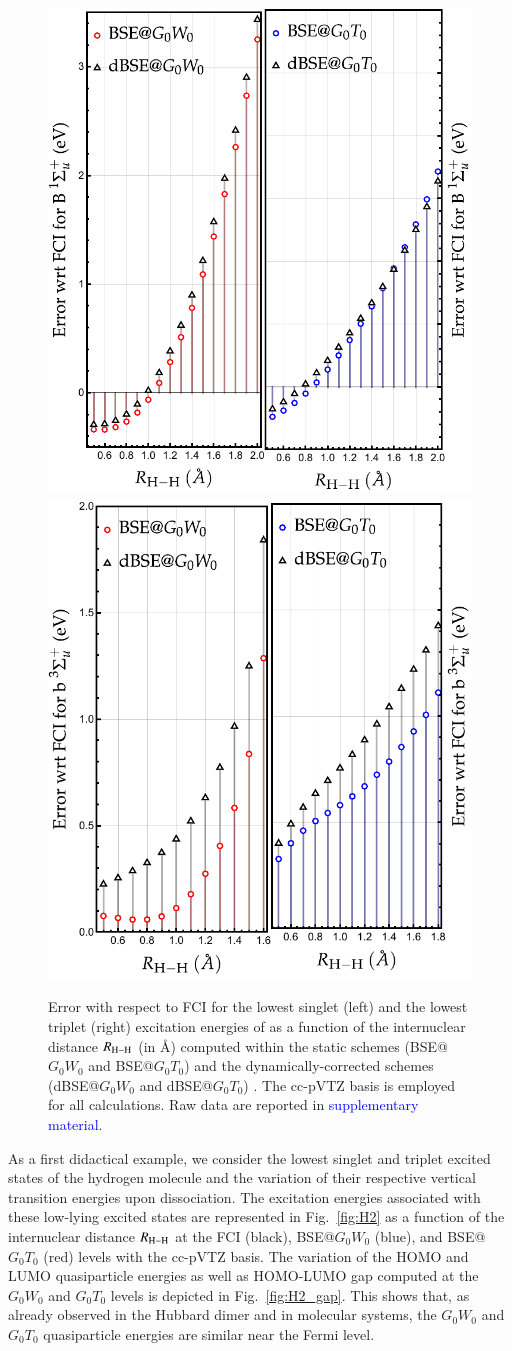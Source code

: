 \documentclass[aip,jcp,reprint,noshowkeys,superscriptaddress]{revtex4-1}
\newcommand{\SupMat}{\textcolor{blue}{supplementary material}}
\begin{document}
\begin{figure}[t]
	\includegraphics[width=0.4\linewidth]{fig3a}
	\hspace{0.1\linewidth}
	\includegraphics[width=0.4\linewidth]{fig3b}
	\caption{
	Error with respect to FCI for the lowest singlet (left) and the lowest triplet (right) excitation energies of  as a function of the internuclear distance $R_{\ce{H-H}}$ (in \si{\angstrom}) computed within the static schemes (BSE@$G_0W_0$ and BSE@$G_0T_0$) and the dynamically-corrected schemes (dBSE@$G_0W_0$ and dBSE@$G_0T_0$) .
	The cc-pVTZ basis is employed for all calculations.
	Raw data are reported in {\SupMat}.}
	\label{fig:H2_dBSE}
\end{figure}

As a first didactical example, we consider the lowest singlet and triplet excited states of the hydrogen molecule  and the variation of their respective vertical transition energies upon dissociation.
The excitation energies associated with these low-lying excited states are represented in Fig.~\ref{fig:H2} as a function of the internuclear distance $R_{\ce{H-H}}$ at the FCI (black), BSE@$G_0W_0$ (blue), and BSE@$G_0T_0$ (red) levels with the cc-pVTZ basis.
The variation of the HOMO and LUMO quasiparticle energies as well as HOMO-LUMO gap computed at the $G_0W_0$ and $G_0T_0$ levels is depicted in Fig.~\ref{fig:H2_gap}.
This shows that, as already observed in the Hubbard dimer \cite{Romaniello_2012} and in molecular systems, \cite{Zhang_2017} the $G_0W_0$ and $G_0T_0$ quasiparticle energies are similar near the Fermi level.
\end{document}
